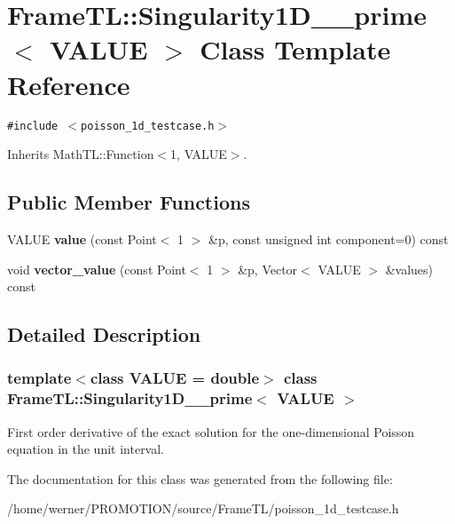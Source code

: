 \hypertarget{classFrameTL_1_1Singularity1D__2__prime}{
\section{FrameTL::Singularity1D\_\_\-prime$<$ VALUE $>$ Class Template Reference}
\label{classFrameTL_1_1Singularity1D__2__prime}
}
{\tt \#include $<$poisson\_\-1d\_\-testcase.h$>$}

Inherits MathTL::Function$<$1, VALUE$>$.

\subsection*{Public Member Functions}
\begin{CompactItemize}
\item 
\hypertarget{classFrameTL_1_1Singularity1D__2__prime_d8365aa295f2a9048f1b109abc070922}{
VALUE \textbf{value} (const Point$<$ 1 $>$ \&p, const unsigned int component=0) const }
\label{classFrameTL_1_1Singularity1D__2__prime_d8365aa295f2a9048f1b109abc070922}

\item 
\hypertarget{classFrameTL_1_1Singularity1D__2__prime_3c07f533d6ce2558d92c10e07470b2ab}{
void \textbf{vector\_\-value} (const Point$<$ 1 $>$ \&p, Vector$<$ VALUE $>$ \&values) const }
\label{classFrameTL_1_1Singularity1D__2__prime_3c07f533d6ce2558d92c10e07470b2ab}

\end{CompactItemize}


\subsection{Detailed Description}
\subsubsection*{template$<$class VALUE = double$>$ class FrameTL::Singularity1D\_\_\-prime$<$ VALUE $>$}

First order derivative of the exact solution for the one-dimensional Poisson equation in the unit interval. 

The documentation for this class was generated from the following file:\begin{CompactItemize}
\item 
/home/werner/PROMOTION/source/FrameTL/poisson\_\-1d\_\-testcase.h\end{CompactItemize}
